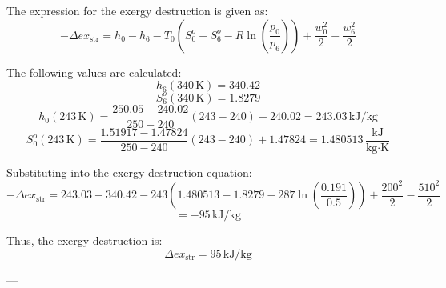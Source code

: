 The expression for the exergy destruction is given as:  
\[
-\Delta ex_{\text{str}} = h_0 - h_6 - T_0(S_0^o - S_6^o - R \ln \left(\frac{p_0}{p_6}\right)) + \frac{w_0^2}{2} - \frac{w_6^2}{2}
\]  

The following values are calculated:  
\[
h_6(340 \, \text{K}) = 340.42
\]  
\[
S_6^o(340 \, \text{K}) = 1.8279
\]  
\[
h_0(243 \, \text{K}) = \frac{250.05 - 240.02}{250 - 240} (243 - 240) + 240.02 = 243.03 \, \text{kJ/kg}
\]  
\[
S_0^o(243 \, \text{K}) = \frac{1.51917 - 1.47824}{250 - 240} (243 - 240) + 1.47824 = 1.480513 \, \frac{\text{kJ}}{\text{kg·K}}
\]  

Substituting into the exergy destruction equation:  
\[
-\Delta ex_{\text{str}} = 243.03 - 340.42 - 243(1.480513 - 1.8279 - 287 \ln \left(\frac{0.191}{0.5}\right)) + \frac{200^2}{2} - \frac{510^2}{2}
\]  
\[
= -95 \, \text{kJ/kg}
\]  

Thus, the exergy destruction is:  
\[
\Delta ex_{\text{str}} = 95 \, \text{kJ/kg}
\]  

---